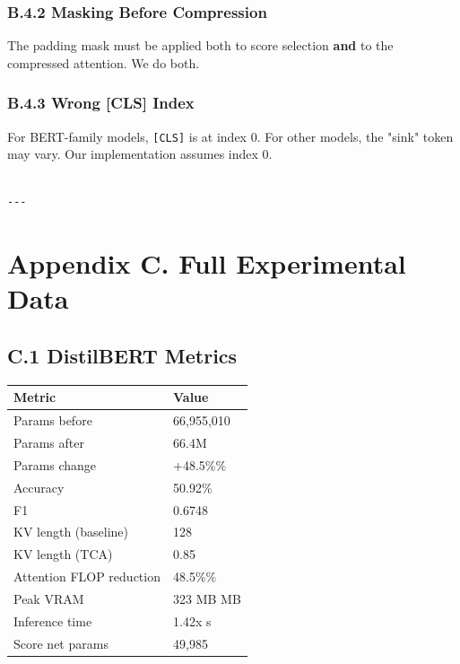 \subsubsection{B.4.2 Masking Before Compression}

The padding mask must be applied both to score selection \textbf{and} to the 
compressed attention. We do both.

\subsubsection{B.4.3 Wrong [CLS] Index}

For BERT-family models, \texttt{[CLS]} is at index 0. For other models, the "sink" 
token may vary. Our implementation assumes index 0.
\begin{lstlisting}

---
\end{lstlisting}

\section{Appendix C. Full Experimental Data}

\subsection{C.1 DistilBERT Metrics}

\begin{table}[H]
\centering
\small
\begin{tabular}{ll}
\toprule
\textbf{Metric} & \textbf{Value} \\
\midrule
Params before & 66,955,010 \\
Params after & 66.4M \\
Params change & +48.5\%\% \\
Accuracy & 50.92\% \\
F1 & 0.6748 \\
KV length (baseline) & 128 \\
KV length (TCA) & 0.85 \\
Attention FLOP reduction & 48.5\%\% \\
Peak VRAM & 323 MB MB \\
Inference time & 1.42x s \\
Score net params & 49,985 \\
\bottomrule
\end{tabular}
\end{table}


